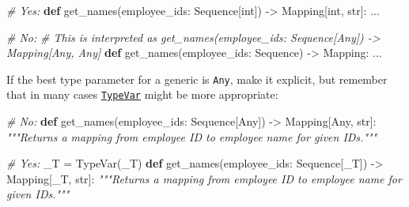 \documentclass[
]{article}
\newenvironment{Shaded}{}{}
\newcommand{\BuiltInTok}[1]{\textcolor[rgb]{0.00,0.50,0.00}{#1}}
\newcommand{\CommentTok}[1]{\textcolor[rgb]{0.38,0.63,0.69}{\textit{#1}}}
\newcommand{\KeywordTok}[1]{\textcolor[rgb]{0.00,0.44,0.13}{\textbf{#1}}}
\newcommand{\NormalTok}[1]{#1}
\newcommand{\OperatorTok}[1]{\textcolor[rgb]{0.40,0.40,0.40}{#1}}
\newcommand{\StringTok}[1]{\textcolor[rgb]{0.25,0.44,0.63}{#1}}
\begin{document}
\begin{samepage}
\begin{Shaded}
\begin{Highlighting}[]
\CommentTok{\# Yes:}
\KeywordTok{def}\NormalTok{ get\_names(employee\_ids: Sequence[}\BuiltInTok{int}\NormalTok{]) }\OperatorTok{{-}\textgreater{}}\NormalTok{ Mapping[}\BuiltInTok{int}\NormalTok{, }\BuiltInTok{str}\NormalTok{]:}
\NormalTok{  ...}
\end{Highlighting}
\end{Shaded}
\end{samepage}

\begin{samepage}
\begin{Shaded}
\begin{Highlighting}[]
\CommentTok{\# No:}
\CommentTok{\# This is interpreted as get\_names(employee\_ids: Sequence[Any]) {-}\textgreater{} Mapping[Any, Any]}
\KeywordTok{def}\NormalTok{ get\_names(employee\_ids: Sequence) }\OperatorTok{{-}\textgreater{}}\NormalTok{ Mapping:}
\NormalTok{  ...}
\end{Highlighting}
\end{Shaded}
\end{samepage}

If the best type parameter for a generic is \texttt{Any}, make it
explicit, but remember that in many cases
\hyperref[typing-type-var]{\texttt{TypeVar}} might be more appropriate:

\begin{samepage}
\begin{Shaded}
\begin{Highlighting}[]
\CommentTok{\# No:}
\KeywordTok{def}\NormalTok{ get\_names(employee\_ids: Sequence[Any]) }\OperatorTok{{-}\textgreater{}}\NormalTok{ Mapping[Any, }\BuiltInTok{str}\NormalTok{]:}
  \CommentTok{"""Returns a mapping from employee ID to employee name for given IDs."""}
\end{Highlighting}
\end{Shaded}
\end{samepage}

\begin{samepage}
\begin{Shaded}
\begin{Highlighting}[]
\CommentTok{\# Yes:}
\NormalTok{\_T }\OperatorTok{=}\NormalTok{ TypeVar(}\StringTok{\textquotesingle{}\_T\textquotesingle{}}\NormalTok{)}
\KeywordTok{def}\NormalTok{ get\_names(employee\_ids: Sequence[\_T]) }\OperatorTok{{-}\textgreater{}}\NormalTok{ Mapping[\_T, }\BuiltInTok{str}\NormalTok{]:}
  \CommentTok{"""Returns a mapping from employee ID to employee name for given IDs."""}
\end{Highlighting}
\end{Shaded}
\end{samepage}
\end{document}
